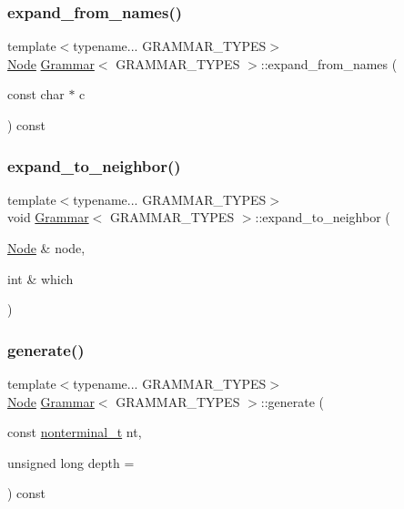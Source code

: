 \subsubsection{\texorpdfstring{expand\+\_\+from\+\_\+names()}{expand\_from\_names()}\hspace{0.1cm}{\footnotesize\ttfamily [3/3]}}
{\footnotesize\ttfamily template$<$typename... G\+R\+A\+M\+M\+A\+R\+\_\+\+T\+Y\+P\+ES$>$ \\
\hyperlink{class_node}{Node} \hyperlink{class_grammar}{Grammar}$<$ G\+R\+A\+M\+M\+A\+R\+\_\+\+T\+Y\+P\+ES $>$\+::expand\+\_\+from\+\_\+names (\begin{DoxyParamCaption}\item[{const char $\ast$}]{c }\end{DoxyParamCaption}) const\hspace{0.3cm}{\ttfamily [inline]}}

\mbox{\label{class_grammar_a0765273e6b0957410447ad5d74e424bf}} 
\subsubsection{\texorpdfstring{expand\+\_\+to\+\_\+neighbor()}{expand\_to\_neighbor()}}
{\footnotesize\ttfamily template$<$typename... G\+R\+A\+M\+M\+A\+R\+\_\+\+T\+Y\+P\+ES$>$ \\
void \hyperlink{class_grammar}{Grammar}$<$ G\+R\+A\+M\+M\+A\+R\+\_\+\+T\+Y\+P\+ES $>$\+::expand\+\_\+to\+\_\+neighbor (\begin{DoxyParamCaption}\item[{\hyperlink{class_node}{Node} \&}]{node,  }\item[{int \&}]{which }\end{DoxyParamCaption})\hspace{0.3cm}{\ttfamily [inline]}}

\mbox{\label{class_grammar_af5dee7ec88bdd66edd023b3c935d2765}} 
\subsubsection{\texorpdfstring{generate()}{generate()}\hspace{0.1cm}{\footnotesize\ttfamily [1/2]}}
{\footnotesize\ttfamily template$<$typename... G\+R\+A\+M\+M\+A\+R\+\_\+\+T\+Y\+P\+ES$>$ \\
\hyperlink{class_node}{Node} \hyperlink{class_grammar}{Grammar}$<$ G\+R\+A\+M\+M\+A\+R\+\_\+\+T\+Y\+P\+ES $>$\+::generate (\begin{DoxyParamCaption}\item[{const \hyperlink{_nonterminal_8h_a1c5bfe9b903f69c83bbde5da7035fef3}{nonterminal\+\_\+t}}]{nt,  }\item[{unsigned long}]{depth = {} }\end{DoxyParamCaption}) const\hspace{0.3cm}{\ttfamily [inline]}}

